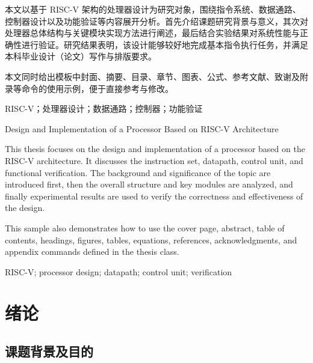 \documentclass{hnnuthesis}
\begin{document}

\makethesistitle


\cabstract
{本文以基于 RISC-V 架构的处理器设计为研究对象，围绕指令系统、数据通路、控制器设计以及功能验证等内容展开分析。首先介绍课题研究背景与意义，其次对处理器总体结构与关键模块实现方法进行阐述，最后结合实验结果对系统性能与正确性进行验证。研究结果表明，该设计能够较好地完成基本指令执行任务，并满足本科毕业设计（论文）写作与排版要求。

本文同时给出模板中封面、摘要、目录、章节、图表、公式、参考文献、致谢及附录等命令的使用示例，便于直接参考与修改。}
{RISC-V；处理器设计；数据通路；控制器；功能验证}


\eabstract
{Design and Implementation of a Processor Based on RISC-V Architecture}
{This thesis focuses on the design and implementation of a processor based on the RISC-V architecture. It discusses the instruction set, datapath, control unit, and functional verification. The background and significance of the topic are introduced first, then the overall structure and key modules are analyzed, and finally experimental results are used to verify the correctness and effectiveness of the design.

This sample also demonstrates how to use the cover page, abstract, table of contents, headings, figures, tables, equations, references, acknowledgments, and appendix commands defined in the thesis class.}
{RISC-V; processor design; datapath; control unit; verification}


\tableofcontents


\startmain

\section{绪论}

\subsection{课题背景及目的}
\end{document}
